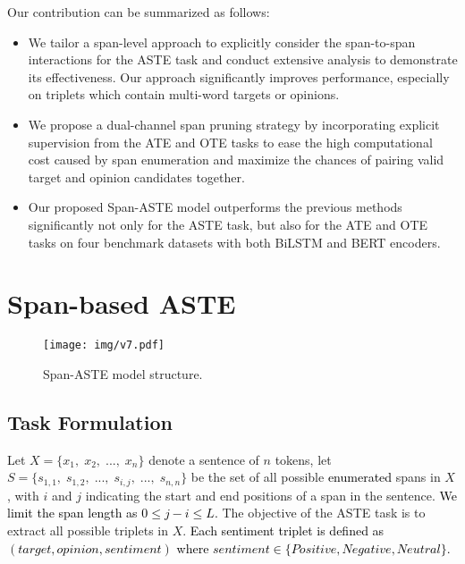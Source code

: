 \documentclass[11pt,a4paper]{article}
\begin{document}
Our contribution can be summarized as follows: 
\begin{itemize}
\item We tailor a span-level approach to explicitly consider the span-to-span interactions for the ASTE task and conduct extensive analysis to demonstrate its effectiveness. Our approach significantly improves performance, especially on triplets which contain multi-word targets or opinions.
\item We propose a dual-channel span pruning strategy by incorporating explicit supervision from the ATE and OTE tasks to ease the high computational cost caused by span enumeration and maximize the chances of pairing valid target and opinion candidates together.
\item Our proposed Span-ASTE model outperforms the previous methods significantly not only for the ASTE task, but also for the ATE and OTE tasks on four benchmark datasets with both BiLSTM and BERT encoders.
    
\end{itemize}














\section{Span-based ASTE}

\begin{figure*}[!t]
\centering
\texttt{[image: img/v7.pdf]}
\caption{Span-ASTE model structure.}
\label{fig:model}
\end{figure*}



\subsection{{Task Formulation}}
Let $X = \{x_1, \; x_2, \; ..., \; x_n\}$ denote a sentence of $n$ tokens, let $S = \{s_{1,1}, \; s_{1,2}, \; ..., \; s_{i,j}, \; ..., \; s_{n,n}\}$ be the set of all possible \textcolor{black}{enumerated} spans in $X$, with $i$ and $j$ indicating the start and end positions of a span in the sentence.
\textcolor{black}{We limit the span length as $0 \leq j-i \leq L$.}
The objective of the ASTE task is to extract all possible triplets in $X$.
\textcolor{black}{Each sentiment triplet is defined as $(target, opinion, sentiment)$ where $sentiment \in \{Positive, Negative, Neutral\}$.}
\end{document}
